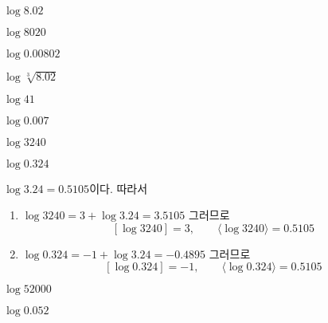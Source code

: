 \documentclass{oblivoir}
\begin{document}
%
\label{common3}
\vspace{-10pt}\par\noindent
\begin{enumerate*}[itemjoin=\qquad\quad]
\item
\(\log8.02\)
\item
\(\log8020\)
\item
\(\log0.00802\)
\item
\(\log\sqrt[3]{8.02}\)
\end{enumerate*}

%
\label{common4}
\vspace{-10pt}\par\noindent
\begin{enumerate*}[itemjoin=\tabto{.5\textwidth}]
\item
\(\log41\)
\item
\(\log0.007\)
\end{enumerate*}

%
\label{common5}
\vspace{-10pt}\par\noindent
\begin{enumerate*}[itemjoin=\tabto{.5\textwidth}]
\item
\(\log3240\)
\item
\(\log0.324\)
\end{enumerate*}
\begin{mdframed}[nobreak=false]
\(\log3.24=0.5105\)이다.
따라서
\begin{enumerate}
\item
\(\log3240=3+\log3.24=3.5105\)
그러므로
\[[\log3240]=3,\qquad\langle\log3240\rangle=0.5105\]
\item
\(\log0.324=-1+\log3.24=-0.4895\)
그러므로
\[[\log0.324]=-1,\qquad\langle\log0.324\rangle=0.5105\]
\end{enumerate}
\end{mdframed}

%
\label{common6}
\vspace{-10pt}\par\noindent
\begin{enumerate*}[itemjoin=\tabto{.5\textwidth}]
\item
\(\log52000\)
\item
\(\log0.052\)
\end{enumerate*}
\end{document}
